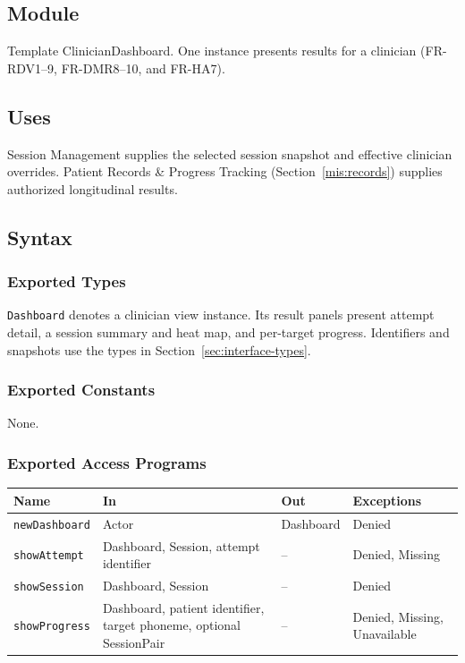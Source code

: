 \documentclass[12pt, titlepage]{article}
\begin{document}
\subsection{Module}
Template ClinicianDashboard. One instance presents results for a clinician
(FR-RDV1--9, FR-DMR8--10, and FR-HA7).

\subsection{Uses}
Session Management supplies the selected session
snapshot and effective clinician overrides. Patient Records \& Progress
Tracking (Section~\ref{mis:records}) supplies authorized longitudinal results.

\subsection{Syntax}

\subsubsection{Exported Types}
\texttt{Dashboard} denotes a clinician view instance. Its result panels
present attempt detail, a session summary and heat map, and per-target
progress. Identifiers and snapshots use the types in
Section~\ref{sec:interface-types}.

\subsubsection{Exported Constants}
None.

\subsubsection{Exported Access Programs}
\noindent\begin{tabularx}{\textwidth}{@{}l X X l@{}}
\toprule
\textbf{Name} & \textbf{In} & \textbf{Out} & \textbf{Exceptions}\\
\midrule
\texttt{newDashboard} & Actor & Dashboard & Denied\\
\texttt{showAttempt} & Dashboard, Session, attempt identifier & -- &
Denied, Missing\\
\texttt{showSession} & Dashboard, Session & -- & Denied\\
\texttt{showProgress} & Dashboard, patient identifier, target phoneme,
optional SessionPair & -- & Denied, Missing, Unavailable\\
\bottomrule
\end{tabularx}
\end{document}
